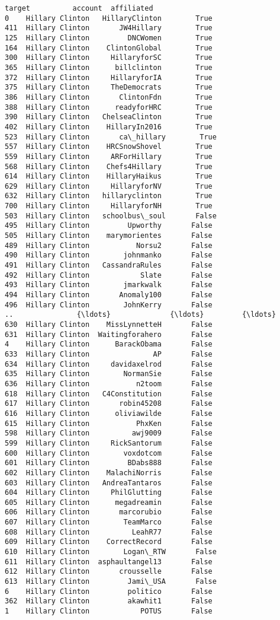 \documentclass[11pt]{article}
\begin{document}
    \begin{Verbatim}[commandchars=\\\{\}]
              target          account  affiliated
0    Hillary Clinton   HillaryClinton        True
411  Hillary Clinton       JW4Hillary        True
125  Hillary Clinton         DNCWomen        True
164  Hillary Clinton    ClintonGlobal        True
300  Hillary Clinton     HillaryforSC        True
365  Hillary Clinton      billclinton        True
372  Hillary Clinton     HillaryforIA        True
375  Hillary Clinton     TheDemocrats        True
386  Hillary Clinton       ClintonFdn        True
388  Hillary Clinton      readyforHRC        True
390  Hillary Clinton   ChelseaClinton        True
402  Hillary Clinton    HillaryIn2016        True
523  Hillary Clinton       ca\_hillary        True
557  Hillary Clinton    HRCSnowShovel        True
559  Hillary Clinton     ARForHillary        True
568  Hillary Clinton    Chefs4Hillary        True
614  Hillary Clinton    HillaryHaikus        True
629  Hillary Clinton     HillaryforNV        True
632  Hillary Clinton   hillaryclinton        True
700  Hillary Clinton     HillaryforNH        True
503  Hillary Clinton   schoolbus\_soul       False
495  Hillary Clinton         Upworthy       False
505  Hillary Clinton    marymorientes       False
489  Hillary Clinton           Norsu2       False
490  Hillary Clinton        johnmanko       False
491  Hillary Clinton   CassandraRules       False
492  Hillary Clinton            Slate       False
493  Hillary Clinton        jmarkwalk       False
494  Hillary Clinton       Anomaly100       False
496  Hillary Clinton        JohnKerry       False
..               {\ldots}              {\ldots}         {\ldots}
630  Hillary Clinton    MissLynnetteH       False
631  Hillary Clinton  Waitingforahero       False
4    Hillary Clinton      BarackObama       False
633  Hillary Clinton               AP       False
634  Hillary Clinton     davidaxelrod       False
635  Hillary Clinton        NormanSie       False
636  Hillary Clinton           n2toom       False
618  Hillary Clinton   C4Constitution       False
617  Hillary Clinton       robin45208       False
616  Hillary Clinton      oliviawilde       False
615  Hillary Clinton           PhxKen       False
598  Hillary Clinton          awj9009       False
599  Hillary Clinton     RickSantorum       False
600  Hillary Clinton        voxdotcom       False
601  Hillary Clinton         BDabs888       False
602  Hillary Clinton    MalachiNorris       False
603  Hillary Clinton   AndreaTantaros       False
604  Hillary Clinton     PhilGlutting       False
605  Hillary Clinton      megadreamin       False
606  Hillary Clinton       marcorubio       False
607  Hillary Clinton        TeamMarco       False
608  Hillary Clinton          LeahR77       False
609  Hillary Clinton    CorrectRecord       False
610  Hillary Clinton        Logan\_RTW       False
611  Hillary Clinton  asphaultangel13       False
612  Hillary Clinton       crousselle       False
613  Hillary Clinton         Jami\_USA       False
6    Hillary Clinton         politico       False
362  Hillary Clinton         akawhit1       False
1    Hillary Clinton            POTUS       False


\end{Verbatim}
\end{document}
